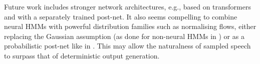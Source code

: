 \documentclass[british]{article}
\begin{document}
Future work includes stronger network architectures, e.g., based on transformers
and with a separately trained post-net.
It also seems compelling to combine neural HMMs with powerful distribution families such as normalising flows, either replacing the Gaussian assumption (as done for non-neural HMMs in \cite{ghosh2021normalizing}) or as a probabilistic post-net like in \cite{kim2020glow}.
This may allow the naturalness of sampled speech to surpass that of deterministic output generation.



\end{document}
